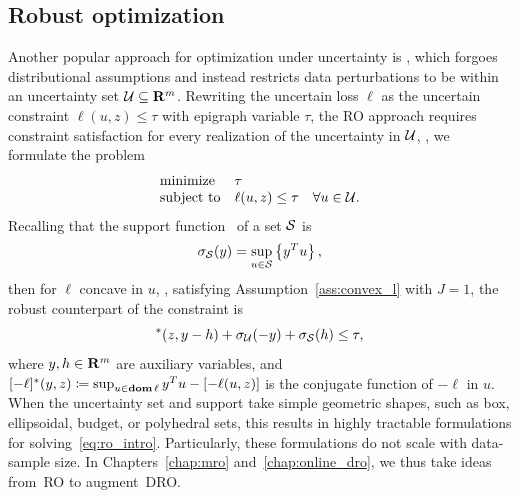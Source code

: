 

\subsection{Robust optimization}
\label{sec:ro_def}
Another popular approach for optimization under uncertainty is , which forgoes distributional assumptions and instead restricts data perturbations to be within an uncertainty set ${\mathcal{U}} \subseteq {\mathbf R}^m$.
Rewriting the uncertain loss $\ell$ as the uncertain constraint $\ell(u,z) \le \tau$ with epigraph variable $\tau$, the \gls{RO} approach requires constraint satisfaction for every realization of the uncertainty in ${\mathcal{U}}$, \ie, we formulate the problem
\begin{equation}
  \label{eq:ro_intro}
	\begin{array}{ll}
		\mbox{minimize} & \tau \\
		\mbox{subject to} & \ell(u, z)  \le \tau  \quad \forall u \in {\mathcal{U}}.
	\end{array}
	\end{equation}
Recalling that the support function~\citep[Section 13]{rockafellar1970convex} of a set $\mathcal{S}$ is
\begin{equation*}
   \sigma_{\mathcal{S}}(y) = \sup\limits_{u\in \mathcal{S}} \left\{y^Tu\right\},
\end{equation*}
then for $\ell$ concave in $u$, \ie, satisfying Assumption~\ref{ass:convex_l} with $J = 1$, the robust counterpart of the constraint is 
\begin{equation*}
    [-\ell]^*(z,y - h) + \sigma_{\uncset}(-y) + \sigma_\supp(h)  \leq \tau,
\end{equation*}
where $y,h\in {\mathbf R}^m$ are auxiliary variables, and $[-\ell]^*(y,z) \coloneqq \sup_{u\in \mathop{\bf dom} \ell} y^Tu - [-\ell(u, z)] $ is the conjugate function of $-\ell$ in $u$. When the uncertainty set and support take simple geometric shapes, such as box, ellipsoidal, budget, or polyhedral sets, this results in highly tractable formulations for solving~\eqref{eq:ro_intro}. Particularly, these formulations do not scale with data-sample size. In Chapters~\ref{chap:mro} and~\ref{chap:online_dro}, we thus take ideas from~\gls{RO} to augment~\gls{DRO}.

